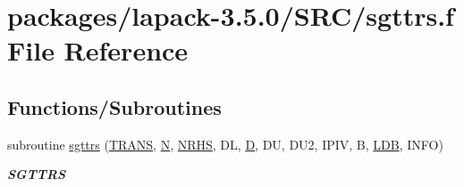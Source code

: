 \hypertarget{sgttrs_8f}{}\section{packages/lapack-\/3.5.0/\+S\+R\+C/sgttrs.f File Reference}
\label{sgttrs_8f}
\subsection*{Functions/\+Subroutines}
\begin{DoxyCompactItemize}
\item 
subroutine \hyperlink{group__realGTcomputational_ga4c1f4f3382563a295c36917d658befb3}{sgttrs} (\hyperlink{superlu__enum__consts_8h_a0c4e17b2d5cea33f9991ccc6a6678d62a1f61e3015bfe0f0c2c3fda4c5a0cdf58}{T\+R\+A\+N\+S}, \hyperlink{polmisc_8c_a0240ac851181b84ac374872dc5434ee4}{N}, \hyperlink{example__user_8c_aa0138da002ce2a90360df2f521eb3198}{N\+R\+H\+S}, D\+L, \hyperlink{odrpack_8h_a7dae6ea403d00f3687f24a874e67d139}{D}, D\+U, D\+U2, I\+P\+I\+V, B, \hyperlink{example__user_8c_a50e90a7104df172b5a89a06c47fcca04}{L\+D\+B}, I\+N\+F\+O)
\begin{DoxyCompactList}\small\item\em {\bfseries S\+G\+T\+T\+R\+S} \end{DoxyCompactList}\end{DoxyCompactItemize}
